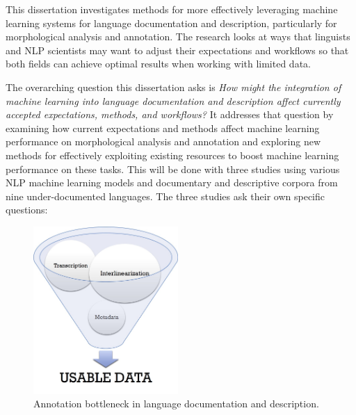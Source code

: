 This dissertation investigates methods for more effectively leveraging machine learning systems for language documentation and description, particularly for morphological analysis and annotation. The research looks at ways that linguists and NLP scientists may want to adjust their expectations and workflows so that both fields can achieve optimal results when working with limited data. 


The overarching question this dissertation asks is \emph{How might the integration of machine learning into language documentation and description affect currently accepted expectations, methods, and workflows?} It addresses that question by examining how current expectations and methods affect machine learning performance on morphological analysis and annotation and exploring new methods for effectively exploiting existing resources to boost machine learning performance on these tasks. This will be done with three studies using various NLP machine learning models and documentary and descriptive corpora from nine under-documented languages. The three studies ask their own specific questions:

\begin{figure}[!b]
    \centering
    \includegraphics[width=5.5cm]{figs/AnnotationFunnel.jpg}
    \caption[Annotation Bottleneck]{Annotation bottleneck in language documentation and description.}
    \label{fig:bottleneck}
\end{figure}


